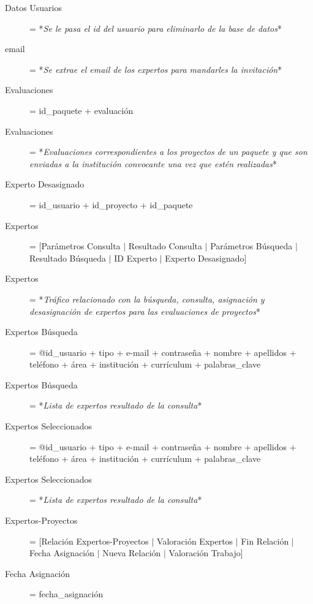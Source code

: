 \documentclass[12pt,a4paper,spanish,twoside]{book}
\begin{document}
\begin{description}
\item[Datos Usuarios] = *\emph{Se le pasa el id del usuario para eliminarlo
    de la base de datos}* 

\item[email] = *\emph{Se extrae el email de los expertos para mandarles la
    invitación}* 

\item[Evaluaciones] = id\_paquete + {evaluación}

\item[Evaluaciones] = *\emph{Evaluaciones correspondientes a los proyectos de
    un paquete y que son enviadas a la institución convocante una vez que
    estén realizadas}* 

\item[Experto Desasignado] = id\_usuario + id\_proyecto + id\_paquete

\item[Expertos] = [Parámetros Consulta $\mid$ Resultado Consulta $\mid$
  Parámetros Búsqueda $\mid$ Resultado Búsqueda $\mid$ ID Experto $\mid$
  Experto Desasignado] 

\item[Expertos] = *\emph{Tráfico relacionado con la búsqueda, consulta,
    asignación y desasignación de expertos para las evaluaciones de
    proyectos}* 

\item[Expertos Búsqueda] = {@id\_usuario + tipo + e-mail + contraseña +
    nombre + apellidos + teléfono + área + institución + currículum +
    {palabras\_clave}} 

\item[Expertos Búsqueda] = *\emph{Lista de expertos resultado de la
    consulta}* 

\item[Expertos Seleccionados] = {@id\_usuario + tipo + e-mail + contraseña +
    nombre + apellidos + teléfono + área + institución + currículum +
    {palabras\_clave}} 

\item[Expertos Seleccionados] = *\emph{Lista de expertos resultado de la
    consulta}* 

\item[Expertos-Proyectos] = [Relación Expertos-Proyectos $\mid$ Valoración
  Expertos $\mid$ Fin Relación $\mid$ Fecha Asignación $\mid$ Nueva Relación
  $\mid$ Valoración Trabajo] 

\item[Fecha Asignación] = fecha\_asignación


\end{description}
\end{document}

